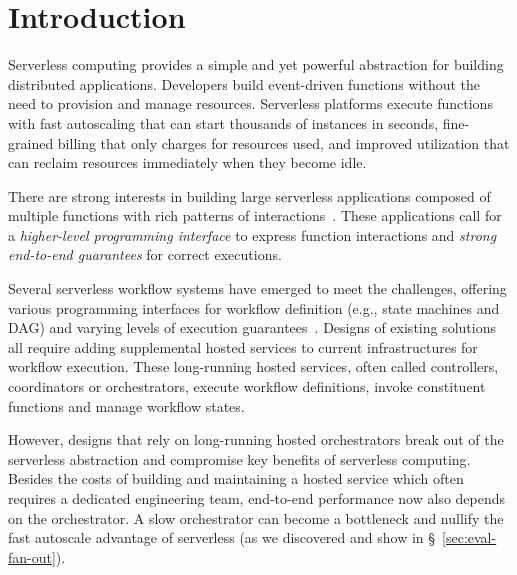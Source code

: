 \section{Introduction}

Serverless computing provides a simple and yet powerful abstraction for
building distributed applications. Developers build event-driven functions
without the need to provision and manage resources. Serverless platforms
execute functions with fast autoscaling that can start thousands of instances
in seconds, fine-grained billing that only charges for resources used, and
improved utilization that can reclaim resources immediately when they become
idle.

There are strong interests in building large serverless applications composed
of multiple functions with rich patterns of interactions~\cite{excamera,
pywren, gg-atc, beldi, boki}. These applications call for a \emph{higher-level
programming interface} to express function interactions and \emph{strong
end-to-end guarantees} for correct executions.

Several serverless workflow systems have emerged to meet the challenges,
offering various programming interfaces for workflow definition (e.g., state
machines and DAG) and varying levels of execution guarantees~\cite{excamera,
gg-atc, aws-step-functions, google-cloud-composer, google-workflows,
durable-functions, kappa}. Designs of existing solutions all require adding
supplemental hosted services to current infrastructures for workflow
execution. These long-running hosted services, often called controllers,
coordinators or orchestrators, execute workflow definitions, invoke
constituent functions and manage workflow states.


However, designs that rely on long-running hosted orchestrators break out of
the serverless abstraction and compromise key benefits of serverless
computing. Besides the costs of building and maintaining a hosted service
which often requires a dedicated engineering team, end-to-end performance now
also depends on the orchestrator. A slow orchestrator can become a
bottleneck and nullify the fast autoscale advantage of serverless (as we
discovered and show in \S~\ref{sec:eval-fan-out}).

